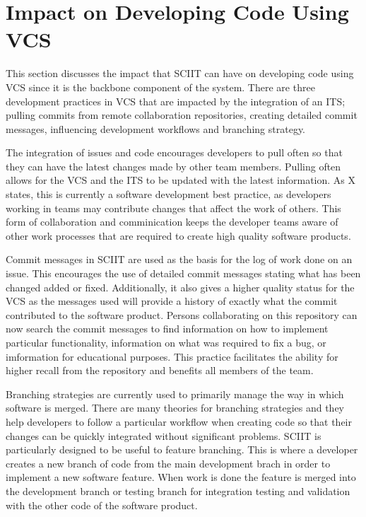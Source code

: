 \documentclass{mproj}
\begin{document}
\section{Impact on Developing Code Using VCS}

This section discusses the impact that SCIIT can have on developing code using VCS since it is the backbone component of the system. There are three development practices in VCS that are impacted by the integration of an ITS; pulling commits from remote collaboration repositories, creating detailed commit messages, influencing development workflows and branching strategy.

The integration of issues and code encourages developers to pull often so that they can have the latest changes made by other team members. Pulling often allows for the VCS and the ITS to be updated with the latest information. As X states, this is currently a software development best practice, as developers working in teams may contribute changes that affect the work of others. This form of collaboration and comminication keeps the developer teams aware of other work processes that are required to create high quality software products.

Commit messages in SCIIT are used as the basis for the log of work done on an issue. This encourages the use of detailed commit messages stating what has been changed added or fixed. Additionally, it also gives a higher quality status for the VCS as the messages used will provide a history of exactly what the commit contributed to the software product. Persons collaborating on this repository can now search the commit messages to find information on how to implement particular functionality, information on what was required to fix a bug, or imformation for educational purposes. This practice facilitates the ability for higher recall from the repository and benefits all members of the team.

Branching strategies are currently used to primarily manage the way in which software is merged. There are many theories for branching strategies and they help developers to follow a particular workflow when creating code so that their changes can be quickly integrated without significant problems. SCIIT is particularly designed to be useful to feature branching. This is where a developer creates a new branch of code from the main development brach in order to implement a new software feature. When work is done the feature is merged into the development branch or testing branch for integration testing and validation with the other code of the software product.
\end{document}

